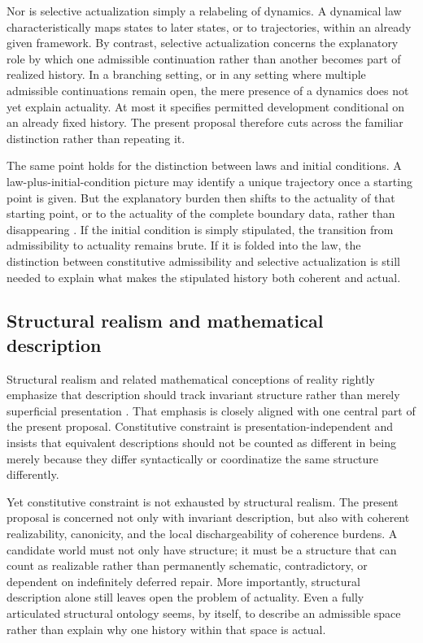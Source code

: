 \documentclass[11pt]{article}
\theoremstyle{foundation}
\begin{document}
Nor is selective actualization simply a relabeling of dynamics. A dynamical law characteristically maps states to later states, or to trajectories, within an already given framework. By contrast, selective actualization concerns the explanatory role by which one admissible continuation rather than another becomes part of realized history. In a branching setting, or in any setting where multiple admissible continuations remain open, the mere presence of a dynamics does not yet explain actuality. At most it specifies permitted development conditional on an already fixed history. The present proposal therefore cuts across the familiar distinction rather than repeating it.

The same point holds for the distinction between laws and initial conditions. A law-plus-initial-condition picture may identify a unique trajectory once a starting point is given. But the explanatory burden then shifts to the actuality of that starting point, or to the actuality of the complete boundary data, rather than disappearing \citep{Armstrong1983,Dretske1977,Tooley1977,Bird2007}. If the initial condition is simply stipulated, the transition from admissibility to actuality remains brute. If it is folded into the law, the distinction between constitutive admissibility and selective actualization is still needed to explain what makes the stipulated history both coherent and actual.

\subsection{Structural realism and mathematical description}

Structural realism and related mathematical conceptions of reality rightly emphasize that description should track invariant structure rather than merely superficial presentation \citep{Worrall1989,Ladyman1998,Shapiro1997,French2014,LadymanRoss2007}. That emphasis is closely aligned with one central part of the present proposal. Constitutive constraint is presentation-independent and insists that equivalent descriptions should not be counted as different in being merely because they differ syntactically or coordinatize the same structure differently.

Yet constitutive constraint is not exhausted by structural realism. The present proposal is concerned not only with invariant description, but also with coherent realizability, canonicity, and the local dischargeability of coherence burdens. A candidate world must not only have structure; it must be a structure that can count as realizable rather than permanently schematic, contradictory, or dependent on indefinitely deferred repair. More importantly, structural description alone still leaves open the problem of actuality. Even a fully articulated structural ontology seems, by itself, to describe an admissible space rather than explain why one history within that space is actual.
\end{document}
